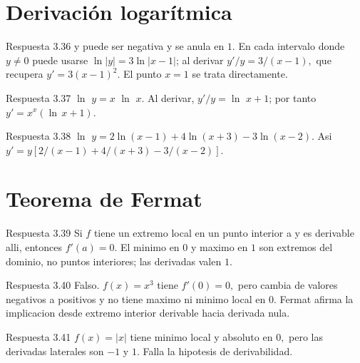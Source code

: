 \documentclass[10pt,a4paper,oneside,openany]{book}
\begin{document}
\section{Derivación logarítmica}
\begin{PSevenAnswerFixed}{Respuesta 3.36}
y puede ser negativa y se anula en \(1\). En cada intervalo donde \(y\ne 0\) puede usarse \(\ln|y|=3\ln|x-1|\); al derivar \(y'/y=3/(x-1),\) que recupera \(y'=3(x-1)^{2}\). El punto \(x=1\) se trata directamente.
\end{PSevenAnswerFixed}
\begin{PSevenAnswerFixed}{Respuesta 3.37}
\(\ln\) \(y=x\) \(\ln\) \(x\). Al derivar, \(y'/y=\ln\) \(x+1\); por tanto \(y'=x^x(\ln\,x+1)\).
\end{PSevenAnswerFixed}
\begin{PSevenAnswerFixed}{Respuesta 3.38}
\(\ln\) \(y=2\ln(x-1)+4\ln(x+3)-3\ln(x-2)\). Asi \(y'=y[2/(x-1)+4/(x+3)-3/(x-2)]\).
\end{PSevenAnswerFixed}
\section{Teorema de Fermat}
\begin{PSevenAnswerFixed}{Respuesta 3.39}
Si \(f\) tiene un extremo local en un punto interior a y es derivable alli, entonces \(f'(a)=0\). El minimo en \(0\) y maximo en \(1\) son extremos del dominio, no puntos interiores; las derivadas valen \(1\).
\end{PSevenAnswerFixed}
\begin{PSevenAnswerFixed}{Respuesta 3.40}
Falso. \(f(x)=x^{3}\) tiene \(f'(0)=0,\) pero cambia de valores negativos a positivos y no tiene maximo ni minimo local en \(0\). Fermat afirma la implicacion desde extremo interior derivable hacia derivada nula.
\end{PSevenAnswerFixed}
\begin{PSevenAnswerFixed}{Respuesta 3.41}
\(f(x)=|x|\) tiene minimo local y absoluto en \(0,\) pero las derivadas laterales son \(-1\) y \(1\). Falla la hipotesis de derivabilidad.
\end{PSevenAnswerFixed}
\end{document}
